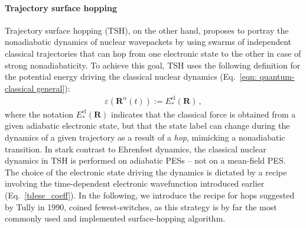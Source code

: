 \documentclass[9pt,bestpractices,pubversion]{livecoms}
\newcommand{\bs}{\mathbf}
\begin{document}
\paragraph{Trajectory surface hopping}
Trajectory surface hopping (TSH), on the other hand, proposes to portray the nonadiabatic dynamics of nuclear wavepackets by using swarms of independent classical trajectories that can hop from one electronic state to the other in case of strong nonadiabaticity.\cite{bjerre1967energy,preston71} To achieve this goal, TSH uses the following definition for the potential energy driving the classical nuclear dynamics (Eq.~\eqref{eqn: quantum-classical general}):
\begin{align}
 \varepsilon(\bs R^{\alpha}(t)) := E_\ast^{\text{el}}(\bs R) \, ,
\label{ehrenfest2}
\end{align}
where the notation $E_\ast^{\text{el}}(\bs R)$ indicates that the classical force is obtained from a given adiabatic electronic state, but that the state label can change during the dynamics of a given trajectory as a result of a \textit{hop}, mimicking a nonadiabatic transition. In stark contrast to Ehrenfest dynamics, the classical nuclear dynamics in TSH is performed on adiabatic PESs -- not on a mean-field PES. The choice of the electronic state driving the dynamics is dictated by a recipe involving the time-dependent electronic wavefunction introduced earlier (Eq.~\eqref{tdese_coeff}). In the following, we introduce the recipe for hops suggested by Tully in 1990,\cite{tully90} coined fewest-switches, as this strategy is by far the most commonly used and implemented surface-hopping algorithm.  
\end{document}
